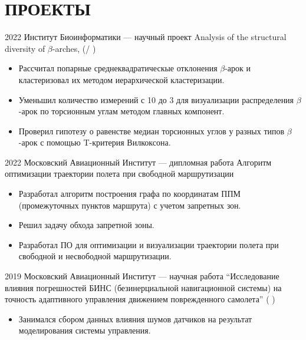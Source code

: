 \section{ПРОЕКТЫ}

    \project
    {2022}
    {Институт Биоинформатики — научный проект}
    {Analysis of the structural diversity of $\beta$-arches, 
    (/
    )}
    {
        \begin{itemize}
            \setlength\itemsep{-.5em}
            \item Рассчитал попарные среднеквадратическые отклонения $\beta$-арок и кластеризовал их методом иерархической кластеризации.
            \item Уменьшил количество измерений с 10 до 3 для визуализации распределения $\beta$-арок по торсионным углам методом главных компонент.
            \item Проверил гипотезу о равенстве медиан торсионных углов у разных типов $\beta$-арок с помощью T-критерия Вилкоксона.
        \end{itemize}
    }
    
    \project
    {2022}
    {Московский Авиационный Институт — дипломная работа}
    {Алгоритм оптимизации траектории полета при свободной маршрутизации}
    {
        \begin{itemize}
            \setlength\itemsep{-.5em}
            \item Разработал алгоритм построения графа по координатам ППМ (промежуточных пунктов маршрута) с учетом запретных зон.
            \item Решил задачу обхода запретной зоны.
            \item Разработал ПО для оптимизации и визуализации траектории полета при свободной и несвободной маршрутизации.
        \end{itemize}
    }
    
    \project
    {2019}
    {Московский Авиационный Институт — научная работа}
    {“Исследование влияния погрешностей БИНС (безинерциальной навигационной системы) на точность адаптивного управления движением поврежденного самолета” (
    )}
    {
        \begin{itemize}
            \setlength\itemsep{-.5em}
            \item Занимался сбором данных влияния шумов датчиков на результат моделирования системы управления.
        \end{itemize}
    }
